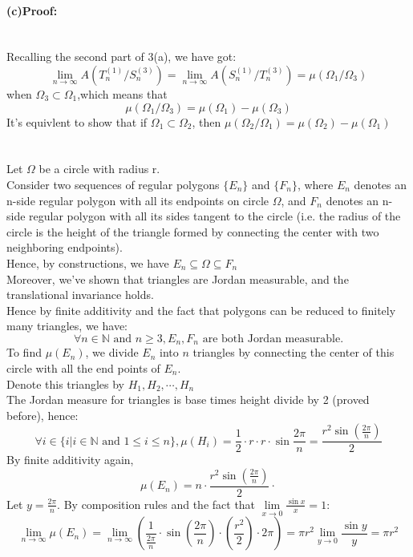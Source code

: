 \documentclass[11pt]{article}
\def\N{\mathbb{N}}
\def\W{\Omega}
\def\to{\rightarrow}
\begin{document}
\paragraph{(c)Proof:}\ \\Recalling the second part of 3(a), we have got:
$$ \lim_{n\to\infty}A(T_n^{(1)}\slash S_n^{(3)})
=\lim_{n\to\infty}A(S_n^{(1)}\slash T_n^{(3)})=\mu(\Omega_1\slash\Omega_3)$$
when $\Omega_3\subset\Omega_1$,which means that
$$\mu(\Omega_1\slash\Omega_3)=\mu(\Omega_1)-\mu(\Omega_3)$$
It's equivlent to show that if $\Omega_1\subset \Omega_2$, then 
$\mu(\Omega_2\slash\Omega_1)=\mu(\Omega_2)-\mu(\Omega_1)$

\section{}
Let $\W$ be a circle with radius r.
\\Consider two sequences of regular polygons $\{E_n\}$ and $\{F_n\}$, where $E_n$ denotes an n-side regular polygon with all its endpoints on circle $\W$, and $F_n$ denotes an n-side regular polygon with all its sides tangent to the circle (i.e. the radius of the circle is the height of the triangle formed by connecting the center with two neighboring endpoints).
\\Hence, by constructions, we have $E_n \subseteq \W \subseteq F_n$
\\Moreover, we've shown that triangles are Jordan measurable, and the translational invariance holds.
\\Hence by finite additivity and the fact that polygons can be reduced to finitely many triangles, we have:
$$\forall n\in \N \text{ and } n\ge 3, E_n, F_n \text{ are both Jordan measurable.}$$
\def\muE{\mu(E_n)}
\def\muF{\mu(F_n)}
To find $\muE$, we divide $E_n$ into $n$ triangles by connecting the center of this circle with all the end points of $E_n$.
\\Denote this triangles by $H_1, H_2, \cdots ,H_n $
\\The Jordan measure for triangles is base times height divide by 2 (proved before), hence:
$$\forall i \in \{i \big| i\in \N\text{ and }1\le i\le n\}, \mu(H_i) = \frac{1}{2} \cdot r\cdot r\cdot \sin \frac{2\pi}{n} = \frac{r^2\sin \left(\frac{2\pi}{n}\right)}{2}$$
By finite additivity again,
$$\muE=n\cdot \frac{r^2\sin\left(\frac{2\pi}{n}\right)}{2}\cdot$$
Let $y=\frac{2\pi}{n}$. By composition rules and the fact that $\lim\limits_{x\to 0}\frac{\sin x}{x}=1$:
$$\lim\limits_{n\to \infty}\muE=\lim\limits_{n\to \infty} \left( \frac{1}{\frac{2\pi}{n}}\cdot \sin \left( \frac{2\pi}{n} \right)\cdot \left(\frac{r^2}{2}\right)\cdot 2\pi \right)=\pi r^2\lim\limits_{y\to 0}\frac{\sin y}{y}=\pi r^2$$
\end{document}
